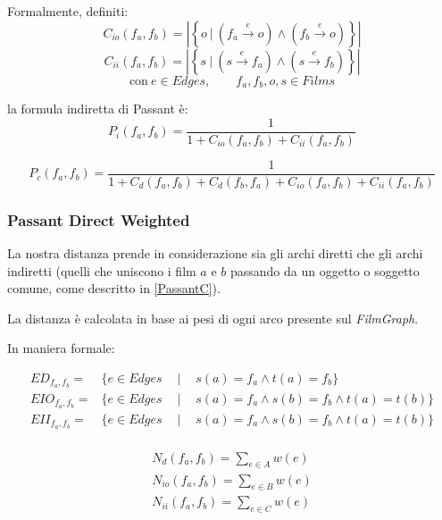 Formalmente, definiti:
$$C_{io}(f_a,f_b) = \left\vert \left\{ o \  | \  (f_a \xrightarrow{~e~} o ) \wedge (f_b \xrightarrow{~e~} o) \right\} \right\vert$$
$$C_{ii}(f_a,f_b) = \left\vert \left\{ s \  | \  ( s \xrightarrow{~e~} f_a ) \wedge ( s \xrightarrow{~e~} f_b) \right\} \right\vert$$ 
$$\text{con} \ e \in Edges  , \qquad f_a,f_b,o,s \in Films $$

la formula indiretta di Passant è:
    \begin{equation}
        P_i(f_{a},f_{b}) = \frac{1} {1+C_{io}(f_{a},f_{b})+C_{ii}(f_{a},f_{b})}
    \end{equation}



    \begin{equation}
P_{c}(f_{a},f_{b}) = \frac{1} {1+C_{d}(f_{a},f_{b})+C_{d}(f_{b},f_{a})+C_{io}(f_{a},f_{b})+C_{ii}(f_{a},f_{b})}
    \end{equation}


\subsubsection{Passant Direct Weighted}
La nostra distanza prende in considerazione sia gli archi diretti che gli archi indiretti (quelli che uniscono i film $a$ e $b$ passando da un oggetto o soggetto comune, come descritto in \ref{PassantC}).

La distanza è calcolata in base ai pesi di ogni arco presente sul \emph{FilmGraph}.

In maniera formale: 

\begin{eqnarray*}
ED_{f_a,f_b} = & \{ e \in Edges \ \quad | \, & \  s(a) = f_a \wedge t(a) = f_b \} \\
EIO_{f_a,f_b} = & \{ e \in Edges \ \quad | \, & \  s(a) = f_a \wedge s(b) = f_b \wedge t(a) = t(b) \}  \\
EII_{f_a,f_b} = & \{ e \in Edges \ \quad | \, & \  s(a) = f_a \wedge s(b) = f_b \wedge t(a) = t(b) \}  \\
\end{eqnarray*}

\begin{eqnarray}
N_{d}(f_a,f_b) = \sum\limits_{e \in A}^{}{w(e)} \\
N_{io}(f_a,f_b) = \sum\limits_{e \in B}^{}{w(e)} \\
N_{ii}(f_a,f_b) = \sum\limits_{e \in C}^{}{w(e)} \\ 
\end{eqnarray}



